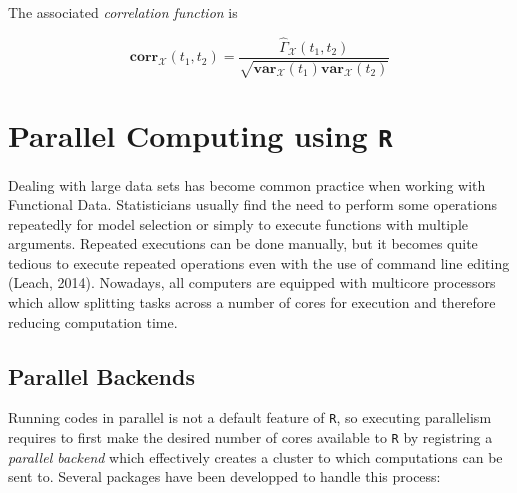The associated \textit{correlation function} is

\begin{equation}
\textbf{corr}_{\mathcal{X}}(t_{1},t_{2})=\frac{\hat{\Gamma}_{\mathcal{X}}(t_{1},t_{2})}{\sqrt{\textbf{var}_{\mathcal{X}}(t_{1})\textbf{var}_{\mathcal{X}}(t_{2})}}
\end{equation}

\clearpage


\section{Parallel Computing using \tt{R}}
Dealing with large data sets has become common practice when working with Functional Data. Statisticians usually find the need to perform some operations repeatedly for model selection or simply to execute functions with multiple arguments.
Repeated executions can be done manually, but it becomes quite tedious to execute repeated operations even with the use of command line editing (Leach, 2014). Nowadays, all computers are equipped with multicore processors which allow splitting tasks across a number of cores for execution and therefore reducing computation time.

\subsection{Parallel Backends}
 Running codes in parallel is not a default feature of \texttt{R}, so executing parallelism requires to first make the desired number of cores available to \texttt{R} by registring a \textit{parallel backend} which effectively creates a cluster to which computations can be sent to. Several packages have been developped to handle this process:
 
